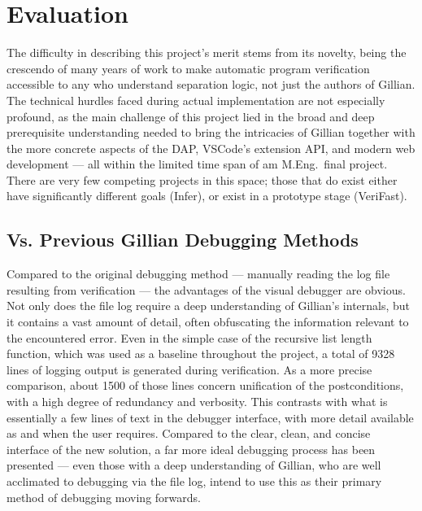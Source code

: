 
\chapter{Evaluation}\label{sec:eval}

The difficulty in describing this project's merit stems from its novelty,
being the crescendo of many years of work to make automatic program verification
accessible to any who understand separation logic, not just the authors of
Gillian. The technical hurdles faced during actual implementation are not
especially profound, as the main challenge of this project lied in the
broad and deep prerequisite understanding needed to bring the intricacies of
Gillian together with the more concrete aspects of the DAP, VSCode's extension
API, and modern web development --- all within the limited time span of am
M.Eng.\ final project. There are very few competing projects in this space;
those that do exist either have significantly different goals (Infer), or exist
in a prototype stage (VeriFast).

\section{Vs. Previous Gillian Debugging Methods}

Compared to the original debugging method --- manually reading the log file
resulting from verification --- the advantages of the visual debugger are
obvious. Not only does the file log require a deep understanding of Gillian's
internals, but it contains a vast amount of detail, often obfuscating the
information relevant to the encountered error.
Even in the simple case of the recursive list length function, which was used as
a baseline throughout the project, a total of 9328 lines of logging output is
generated during verification. As a more precise comparison, about 1500 of those
lines concern unification of the postconditions, with a high degree of
redundancy and verbosity. This contrasts with what is essentially a few lines of
text in the debugger interface, with more detail available as and when the user
requires. Compared to the clear, clean, and concise interface of the new
solution, a far more ideal debugging process has been presented --- even those
with a deep understanding of Gillian, who are well acclimated to debugging via
the file log, intend to use this as their primary method of debugging moving
forwards.

